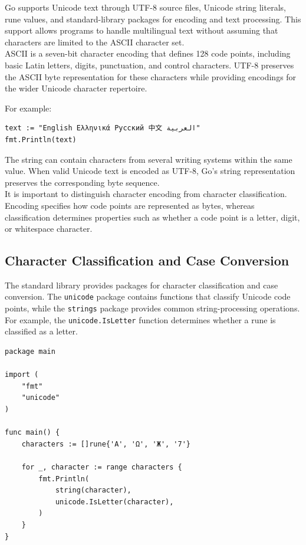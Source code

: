 Go supports Unicode text through UTF-8 source files, Unicode string literals, rune values, and standard-library packages for encoding and text processing. This support allows programs to handle multilingual text without assuming that characters are limited to the ASCII character set.\\

ASCII is a seven-bit character encoding that defines 128 code points, including basic Latin letters, digits, punctuation, and control characters. UTF-8 preserves the ASCII byte representation for these characters while providing encodings for the wider Unicode character repertoire.

For example:

\begin{lstlisting}
text := "English Ελληνικά Русский 中文 العربية"
fmt.Println(text)
\end{lstlisting}

The string can contain characters from several writing systems within the same value. When valid Unicode text is encoded as UTF-8, Go's string representation preserves the corresponding byte sequence.\\

It is important to distinguish character encoding from character classification. Encoding specifies how code points are represented as bytes, whereas classification determines properties such as whether a code point is a letter, digit, or whitespace character.

\subsection{Character Classification and Case Conversion}

The standard library provides packages for character classification and case conversion. The \texttt{unicode} package contains functions that classify Unicode code points, while the \texttt{strings} package provides common string-processing operations.\\

For example, the \texttt{unicode.IsLetter} function determines whether a rune is classified as a letter.

\begin{lstlisting}
package main

import (
    "fmt"
    "unicode"
)

func main() {
    characters := []rune{'A', 'Ω', 'Ж', '7'}

    for _, character := range characters {
        fmt.Println(
            string(character),
            unicode.IsLetter(character),
        )
    }
}
\end{lstlisting}

